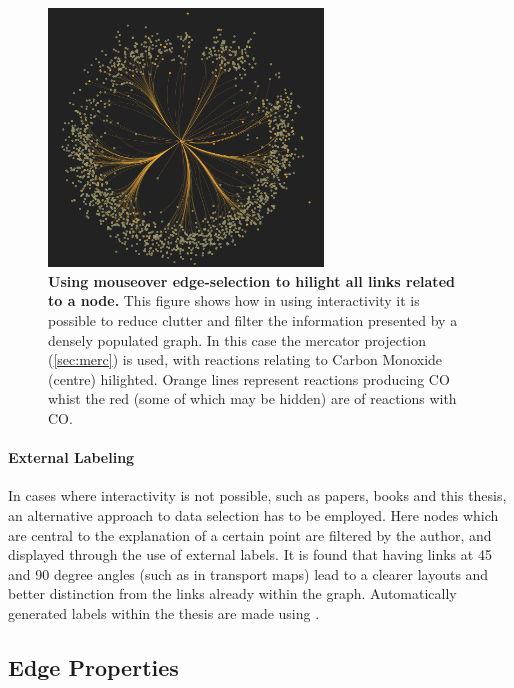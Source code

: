\begin{figure}[H]
     \centering
     \includegraphics[width=0.65\textwidth]{figures_c1/layout/CObranches.png}
        \caption{\textbf{Using mouseover edge-selection to hilight all links related to a node. } This figure shows how in using interactivity it is possible to reduce clutter and filter the information presented by a densely populated graph. In this case the mercator projection (\autoref{sec:merc}) is used, with reactions relating to Carbon Monoxide (centre) hilighted. Orange lines represent reactions producing CO whist the red (some of which may be hidden) are of reactions with CO.  }
      \label{fig:tooltip}
\end{figure}



\paragraph*{\color{c5}External Labeling}
In cases where interactivity is not possible, such as papers, books and this thesis, an alternative approach to data selection has to be employed. Here nodes which are central to the explanation of a certain point are filtered by the author, and displayed through the use of external labels. It is found that having links at 45 and 90 degree angles (such as in transport maps) lead to a clearer layouts and better distinction from the links already within the graph. Automatically generated labels within the thesis are made using \cite{d3annotate}.







\subsection{Edge Properties}


